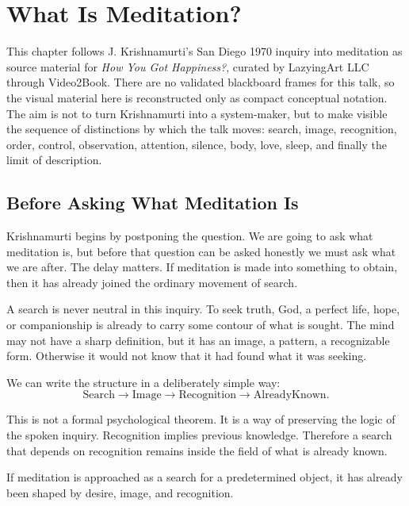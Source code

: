 \chapter{What Is Meditation?}

This chapter follows J. Krishnamurti's San Diego 1970 inquiry into meditation as source material for \emph{How You Got Happiness?}, curated by LazyingArt LLC through Video2Book. There are no validated blackboard frames for this talk, so the visual material here is reconstructed only as compact conceptual notation. The aim is not to turn Krishnamurti into a system-maker, but to make visible the sequence of distinctions by which the talk moves: search, image, recognition, order, control, observation, attention, silence, body, love, sleep, and finally the limit of description.

\section{Before Asking What Meditation Is}

Krishnamurti begins by postponing the question. We are going to ask what meditation is, but before that question can be asked honestly we must ask what we are after. The delay matters. If meditation is made into something to obtain, then it has already joined the ordinary movement of search.

A search is never neutral in this inquiry. To seek truth, God, a perfect life, hope, or companionship is already to carry some contour of what is sought. The mind may not have a sharp definition, but it has an image, a pattern, a recognizable form. Otherwise it would not know that it had found what it was seeking.

We can write the structure in a deliberately simple way:
\begin{equation}
\mathrm{Search}
\longrightarrow
\mathrm{Image}
\longrightarrow
\mathrm{Recognition}
\longrightarrow
\mathrm{AlreadyKnown}.
\end{equation}

This is not a formal psychological theorem. It is a way of preserving the logic of the spoken inquiry. Recognition implies previous knowledge. Therefore a search that depends on recognition remains inside the field of what is already known.

\begin{proposition}
If meditation is approached as a search for a predetermined object, it has already been shaped by desire, image, and recognition.
\end{proposition}

